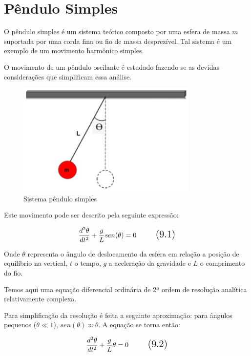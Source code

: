 \section{Pêndulo Simples}

O pêndulo simples é um sistema teórico composto por uma esfera de massa $m$ suportada por uma corda fina ou fio de massa desprezível. Tal sistema é um exemplo de um movimento harmônico simples.

O movimento de um pêndulo oscilante é estudado fazendo se as devidas considerações que simplificam essa análise.

\begin{figure}[H]
	\centering
	\includegraphics[width=0.8\textwidth]{./Imagens/Pendulo simples/ps1.png} 
	\caption{Sistema pêndulo simples}
	\label{fig:PS1}
\end{figure}

Este movimento pode ser descrito pela seguinte expressão:

\begin{equation}
\Large \frac{d^2\theta}{dt^2} + \frac{g}{L}sen(\theta) = 0
\tag{9.1}
\end{equation}

Onde $\theta$ representa o ângulo de deslocamento da esfera em relação a posição de equilíbrio na vertical, $t$  o tempo, $g$ a aceleração da gravidade e $L$ o comprimento do fio.

Temos aqui uma equação diferencial ordinária de 2ª ordem de resolução analítica relativamente complexa.

Para simplificação da resolução é feita a seguinte aproximação: para ângulos pequenos ($\theta \ll 1$),  $sen(\theta)  \approx  \theta$.  A equação se torna então: 

\begin{equation}
\Large \frac{d^2\theta}{dt^2} + \frac{g}{L}\theta = 0
\tag{9.2}
\end{equation}

